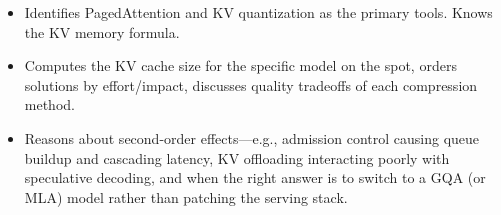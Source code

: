 \begin{interviewq}

\goodgreat
\begin{itemize}
    \item {} Identifies PagedAttention and KV quantization as the primary tools. Knows the KV memory formula.
    \item {} Computes the KV cache size for the specific model on the spot, orders solutions by effort/impact, discusses quality tradeoffs of each compression method.
    \item {} Reasons about second-order effects---e.g., admission control causing queue buildup and cascading latency, KV offloading interacting poorly with speculative decoding, and when the right answer is to switch to a GQA (or MLA) model rather than patching the serving stack.
\end{itemize}

\end{interviewq}


